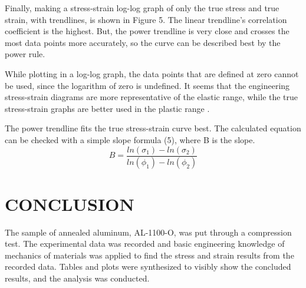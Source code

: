 \documentclass[12pt]{article}
\begin{document}

\newpage

Finally, making a stress-strain log-log graph of only the true stress and true strain, with trendlines, is shown in Figure 5. The linear trendline’s correlation coefficient is the highest. But, the power trendline is very close and crosses the most data points more accurately, so the curve can be described best by the power rule.
\bigskip



While plotting in a log-log graph, the data points that are defined at zero cannot be used, since the logarithm of zero is undefined. It seems that the engineering stress-strain diagrams are more representative of the elastic range, while the true stress-strain graphs are better used in the plastic range \cite{Roylance,Faridmehr}.
\bigskip

The power trendline fits the true stress-strain curve best. The calculated equation can be checked with a simple slope formula (5), where B is the slope.
\begin{equation}
B = \frac{ln(\sigma_1) - ln(\sigma_2)}{ln(\phi_1) - ln(\phi_2)}
\end{equation}

\newpage






\section*{\fontsize{12}{12}\selectfont CONCLUSION}
The sample of annealed aluminum, AL-1100-O, was put through a compression test. The experimental data was recorded and basic engineering knowledge of mechanics of materials was applied to find the stress and strain results from the recorded data. Tables and plots were synthesized to visibly show the concluded results, and the analysis was conducted. 
\bigskip
\end{document}
